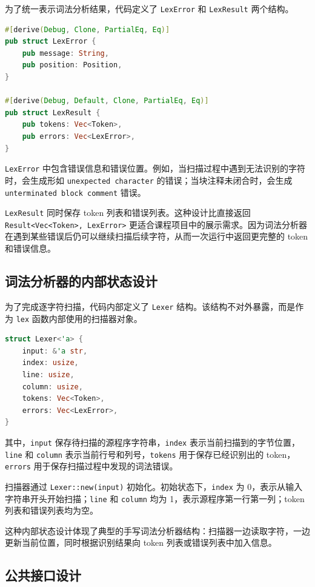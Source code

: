 \documentclass[UTF8,a4paper,12pt]{ctexart}
\begin{document}
为了统一表示词法分析结果，代码定义了 \texttt{LexError} 和 \texttt{LexResult} 两个结构。

\begin{lstlisting}[language=Rust,caption={LexError 与 LexResult 结构定义}]
#[derive(Debug, Clone, PartialEq, Eq)]
pub struct LexError {
    pub message: String,
    pub position: Position,
}

#[derive(Debug, Default, Clone, PartialEq, Eq)]
pub struct LexResult {
    pub tokens: Vec<Token>,
    pub errors: Vec<LexError>,
}
\end{lstlisting}

\texttt{LexError} 中包含错误信息和错误位置。例如，当扫描过程中遇到无法识别的字符时，会生成形如 \texttt{unexpected character} 的错误；当块注释未闭合时，会生成 \texttt{unterminated block comment} 错误。

\texttt{LexResult} 同时保存 token 列表和错误列表。这种设计比直接返回 \texttt{Result<Vec<Token>, LexError>} 更适合课程项目中的展示需求。因为词法分析器在遇到某些错误后仍可以继续扫描后续字符，从而一次运行中返回更完整的 token 和错误信息。

\subsection{词法分析器的内部状态设计}

为了完成逐字符扫描，代码内部定义了 \texttt{Lexer} 结构。该结构不对外暴露，而是作为 \texttt{lex} 函数内部使用的扫描器对象。

\begin{lstlisting}[language=Rust,caption={Lexer 内部状态定义}]
struct Lexer<'a> {
    input: &'a str,
    index: usize,
    line: usize,
    column: usize,
    tokens: Vec<Token>,
    errors: Vec<LexError>,
}
\end{lstlisting}

其中，\texttt{input} 保存待扫描的源程序字符串，\texttt{index} 表示当前扫描到的字节位置，\texttt{line} 和 \texttt{column} 表示当前行号和列号，\texttt{tokens} 用于保存已经识别出的 token，\texttt{errors} 用于保存扫描过程中发现的词法错误。

扫描器通过 \texttt{Lexer::new(input)} 初始化。初始状态下，\texttt{index} 为 0，表示从输入字符串开头开始扫描；\texttt{line} 和 \texttt{column} 均为 1，表示源程序第一行第一列；token 列表和错误列表均为空。

这种内部状态设计体现了典型的手写词法分析器结构：扫描器一边读取字符，一边更新当前位置，同时根据识别结果向 token 列表或错误列表中加入信息。

\subsection{公共接口设计}
\end{document}
